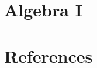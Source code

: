 

%

\newtoggle{thmsty}
\togglefalse{thmsty}

\newtoggle{longpres}
\togglefalse{longpres}









	\begin{frame}
		\titlepage
	\end{frame}
	
%	
		
	\section{Algebra I}
	
%	
%		
%	
%	
%	
%    
%	
%	
%	
%	
%	
	\section{References}
	
	
